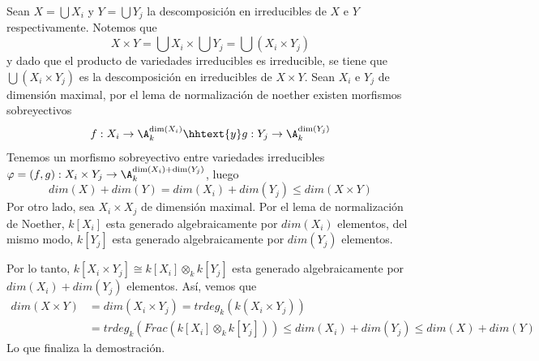\documentclass{article}
\begin{document}
Sean $X=\bigcup X_{i}$ y $Y=\bigcup Y_{j}$ la descomposición en irreducibles de $X$ e $Y$ 
respectivamente. Notemos que
\begin{equation*}
    X\times Y=\bigcup X_{i}\times\bigcup Y_{j}=\bigcup(X_{i}\times Y_{j})
\end{equation*}
y dado que el producto de variedades irreducibles es irreducible, se tiene que 
$\bigcup(X_{i}\times Y_{j})$ es la descomposición en irreducibles de $X\times Y$. Sean $X_{i}$ e
$Y_{j}$ de dimensión maximal, por el lema de normalización de noether existen morfismos 
sobreyectivos
\begin{equation*}
    f:X_{i}\to\A_{k}^{\dim(X_{i})} \hhtext{y} g:Y_{j}\to\A_{k}^{\dim(Y_{j})}
\end{equation*}
Tenemos un morfismo sobreyectivo entre variedades irreducibles
$\varphi=(f,g):X_{i}\times Y_{j}\to\A_{k}^{\dim(X_{i})+\dim(Y_{j})}$, luego
\begin{equation*}
    dim(X)+dim(Y)=dim(X_{i})+dim(Y_{j})\leq dim(X\times Y)
\end{equation*}
Por otro lado, sea $X_{i}\times X_{j}$ de dimensión maximal. Por el lema de normalización de 
Noether, $k[X_{i}]$ esta generado algebraicamente por $dim(X_{i})$ elementos, del mismo modo,
$k[Y_{j}]$ esta generado algebraicamente por $dim(Y_{j})$ elementos.

\vspace{2mm}
Por lo tanto, $k[X_{i}\times Y_{j}]\cong k[X_{i}]\otimes_{k} k[Y_{j}]$ esta generado 
algebraicamente por $dim(X_{i})+dim(Y_{j})$ elementos. Así, vemos que
\begin{align*}
    dim(X\times Y) &= dim(X_{i}\times Y_{j})=trdeg_{k}(k(X_{i}\times Y_{j})) \\
    &= trdeg_{k}(Frac(k[X_{i}]\otimes_{k} k[Y_{j}]))\leq dim(X_{i})+dim(Y_{j})\leq dim(X)+dim(Y)
\end{align*}
Lo que finaliza la demostración.
\end{document}
